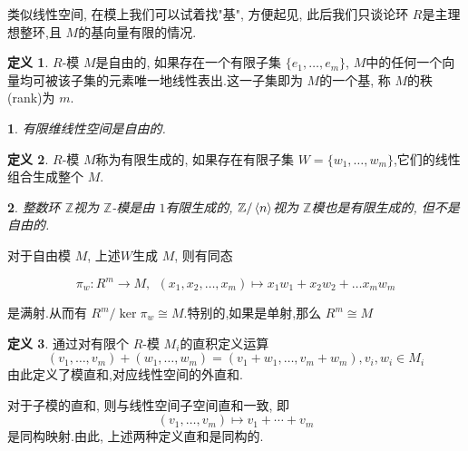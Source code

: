 \documentclass[12pt, a4paper,oneside, UTF8]{ctexart}
\theoremstyle{definition}
\newtheorem{defn}{\indent 定义}
\theoremstyle{plain}
\newtheorem{example}{\indent {例}} %
\begin{document}
类似线性空间, 在模上我们可以试着找"基", 方便起见, 此后我们只谈论环 $R$是主理想整环,且 $M$的基向量有限的情况.

\begin{defn}
     $R$-模 $M$是自由的, 如果存在一个有限子集 $\{ e_1, \ldots ,e_{m} \}$, $M$中的任何一个向量均可被该子集的元素唯一地线性表出.这一子集即为 $M$的一个基, 称 $M$的秩(rank)为 $m$.
\end{defn}

 \begin{example}
    有限维线性空间是自由的.
 \end{example}

 \begin{defn}
    $R$-模 $M$称为有限生成的, 如果存在有限子集 $W = \{ w_1, \ldots ,w_{m} \}$,它们的线性组合生成整个 $M$.
 \end{defn}
\begin{example}
    整数环 $\mathbb{Z}$视为 $\mathbb{Z}$-模是由 $1$有限生成的, $\mathbb{Z}/ \braket{n}$视为 $\mathbb{Z}$模也是有限生成的, 但不是自由的.
\end{example}
 

对于自由模 $M$, 上述$W$生成 $M$, 则有同态

    $$\pi _{w} : R^{m} \to M, \ \ (x_{1},x_{2},\dots,x_{m}) \mapsto x_{1}w_{1}+x_{2}w_{2}+\dots x_{m}w_{m}$$
    
    是满射.从而有 $R^{m}/ \operatorname{ker}\pi_{w} \cong M$.特别的,如果是单射,那么 $R^{m} \cong M$



\begin{defn}
    通过对有限个 $R$-模 $M_{i}$的直积定义运算
    \[
    (v_1, \ldots ,v_{m})+(w_1, \ldots ,w_{m}) =(v_1+w_1, \ldots , v_{m}+w_{m}), v_{i},w_i\in M_i
    \]
    由此定义了模直和,对应线性空间的外直和.

    对于子模的直和, 则与线性空间子空间直和一致, 即
    $$(v_1, \ldots ,v_{m}) \mapsto v_1+ \cdots +v_{m}$$
    是同构映射.由此, 上述两种定义直和是同构的.
\end{defn}
\end{document}

